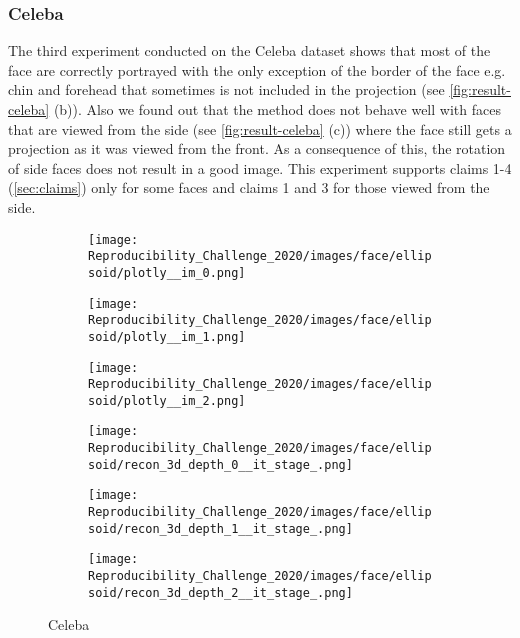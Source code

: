 \subsubsection{Celeba}
The third experiment conducted on the Celeba dataset shows that most of the face are correctly portrayed with the only exception of the border of the face e.g. chin and forehead that sometimes is not included in the projection (see \autoref{fig:result-celeba} (b)). Also we found out that the method does not behave well with faces that are viewed from the side (see \autoref{fig:result-celeba} (c)) where the face still gets a projection as it was viewed from the front. As a consequence of this, the rotation of side faces does not result in a good image. This experiment supports claims 1-4 (\autoref{sec:claims}) only for some faces and claims 1 and 3 for those viewed from the side.
\begin{figure}[h]
    \begin{subfigure}{0.33\textwidth}
        \centering
        \texttt{[image: Reproducibility\_Challenge\_2020/images/face/ellipsoid/plotly\_\_im\_0.png]}
    \end{subfigure}
    \begin{subfigure}{0.33\textwidth}
        \centering
        \texttt{[image: Reproducibility\_Challenge\_2020/images/face/ellipsoid/plotly\_\_im\_1.png]}
    \end{subfigure}
    \begin{subfigure}{0.33\textwidth}
        \centering
        \texttt{[image: Reproducibility\_Challenge\_2020/images/face/ellipsoid/plotly\_\_im\_2.png]}
    \end{subfigure}
    \begin{subfigure}{0.33\textwidth}
        \centering
        \texttt{[image: Reproducibility\_Challenge\_2020/images/face/ellipsoid/recon\_3d\_depth\_0\_\_it\_stage\_.png]}
        \caption{}
    \end{subfigure}
    \begin{subfigure}{0.33\textwidth}
        \centering
        \texttt{[image: Reproducibility\_Challenge\_2020/images/face/ellipsoid/recon\_3d\_depth\_1\_\_it\_stage\_.png]}
        \caption{}
    \end{subfigure}
    \begin{subfigure}{0.33\textwidth}
        \centering
        \texttt{[image: Reproducibility\_Challenge\_2020/images/face/ellipsoid/recon\_3d\_depth\_2\_\_it\_stage\_.png]}
        \caption{}
    \end{subfigure}
    \caption{Celeba}
    \label{fig:result-celeba}
\end{figure}

